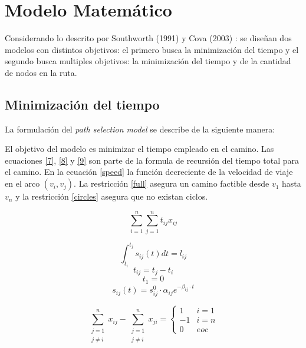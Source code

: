 \documentclass[letter, 10pt]{article}
\begin{document}
\section{Modelo Matem\'atico}
Considerando lo descrito por Southworth (1991) \cite{southworth1991regional} y Cova (2003) \cite{cova2003network}: se diseñan dos modelos con distintos objetivos: el primero busca la minimización del tiempo y el segundo busca multiples objetivos: la minimización del tiempo y de la cantidad de nodos en la ruta.


\subsection{Minimización del tiempo} 

La formulación del \textit{path selection model} se describe de la siguiente manera:

El objetivo del modelo es minimizar el tiempo empleado en el camino. Las ecuaciones \eqref{7}, \eqref{8} y \eqref{9} son parte de la formula de recursión del tiempo total para el camino. En la ecuación \eqref{speed} la función decreciente de la velocidad de viaje en el arco $(v_i,v_j)$. La restricción \eqref{full} asegura un camino factible desde $v_1$ hasta $v_n$ y la restricción \eqref{circles} asegura que no existan ciclos.

\begin{equation}
	 \sum_{i=1}^{n}\sum_{j=1}^{n} t_{ij}x_{ij}
\end{equation}

\begin{equation}\label{7}
  \int_{t_i}^{t_j} s_{ij}(t)dt = l_{ij}
\end{equation}
\begin{equation}\label{8}
  t_{ij} = t_j - t_i
\end{equation}
\begin{equation}\label{9}
t_1 =0
\end{equation}
\begin{equation}\label{speed}
  s_{ij}(t) = s_{ij}^0 \cdot \alpha_{ij} e^{-\beta_{ij}\cdot t}
\end{equation}

\begin{equation}\label{full}
	\sum_{\substack{j=1\\
                  j \neq i}}^n x_{ij} - \sum_{\substack{j=1\\
                  j \neq i}}^{n} x_{ji} = \begin{cases}
1 & i=1\\
-1 & i=n \\
0 & eoc
\end{cases}
\end{equation}
\end{document}
